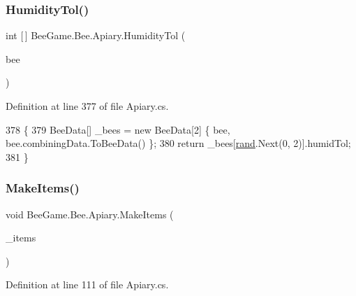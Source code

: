 \subsubsection{\texorpdfstring{Humidity\+Tol()}{HumidityTol()}}
{\footnotesize\ttfamily int \mbox{[}$\,$\mbox{]} Bee\+Game.\+Bee.\+Apiary.\+Humidity\+Tol (\begin{DoxyParamCaption}\item[{\hyperlink{struct_bee_game_1_1_bee_1_1_bee_data}{Bee\+Data}}]{bee }\end{DoxyParamCaption})\hspace{0.3cm}{\ttfamily [private]}}



Definition at line 377 of file Apiary.\+cs.


\begin{DoxyCode}
378         \{
379             BeeData[] \_bees = \textcolor{keyword}{new} BeeData[2] \{ bee, bee.combiningData.ToBeeData() \};
380             \textcolor{keywordflow}{return} \_bees[\hyperlink{class_bee_game_1_1_bee_1_1_apiary_a272ac8b385ad3a7cd358b0959d561be7}{rand}.Next(0, 2)].humidTol;
381         \}
\end{DoxyCode}
\mbox{\label{class_bee_game_1_1_bee_1_1_apiary_aaa6f9e38434722e3db40ae753a8bb752}} 
\subsubsection{\texorpdfstring{Make\+Items()}{MakeItems()}}
{\footnotesize\ttfamily void Bee\+Game.\+Bee.\+Apiary.\+Make\+Items (\begin{DoxyParamCaption}\item[{\hyperlink{struct_bee_game_1_1_items_1_1_item}{Item} \mbox{[}$\,$\mbox{]}}]{\+\_\+items }\end{DoxyParamCaption})\hspace{0.3cm}{\ttfamily [private]}}



Definition at line 111 of file Apiary.\+cs.



